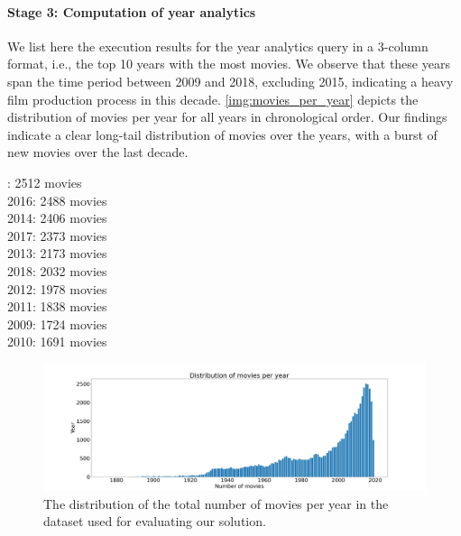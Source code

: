 \documentclass[acmlarge]{acmart}
\begin{document}
\paragraph{Stage 3: Computation of year analytics}
We list here the execution results for the year analytics query in a 3-column format, i.e., the top 10 years with the most movies. We observe that these years span the time period between 2009 and 2018, excluding 2015, indicating a heavy film production process in this decade. \autoref{img:movies_per_year} depicts the distribution of movies per year for all years in chronological order. Our findings indicate a clear long-tail distribution of movies over the years, with a burst of new movies over the last decade.
\begin{multicols}{3}
  \centering
  : 2512 movies
  \\ 2016: 2488 movies
  \\ 2014: 2406 movies
  \\ 2017: 2373 movies
  \\ 2013: 2173 movies
  \\ 2018: 2032 movies
  \\ 2012: 1978 movies
  \\ 2011: 1838 movies
  \\ 2009: 1724 movies
  \\ 2010: 1691 movies
\end{multicols}

\begin{figure}[tb!]
  \centering
  \includegraphics[width=\linewidth]{figures/movies per year}
  \caption{The distribution of the total number of movies per year in the dataset used for evaluating our solution.}
  \label{img:movies_per_year} 
\end{figure}
\end{document}
